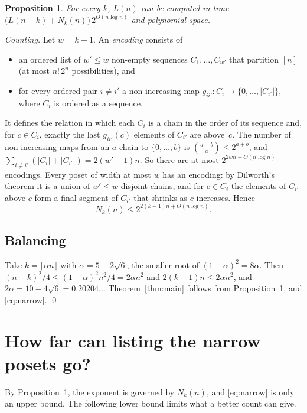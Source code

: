 \documentclass[11pt]{article}
\newtheorem{proposition}[theorem]{Proposition}
\theoremstyle{definition}
\theoremstyle{remark}
\begin{document}
\begin{proposition}\label{prop:time}
For every $k$, $L(n)$ can be computed in time
$\bigl(L(n-k)+N_k(n)\bigr)\,2^{O(n\log n)}$ and polynomial space.
\end{proposition}

\emph{Counting.} Let $w=k-1$. An \emph{encoding} consists of
\begin{itemize}
\item an ordered list of $w'\le w$ non-empty sequences $C_1,\dots,C_{w'}$ that partition
  $[n]$ (at most $n!\,2^n$ possibilities), and
\item for every ordered pair $i\ne i'$ a non-increasing map
  $g_{ii'}\colon C_i\to\{0,\dots,|C_{i'}|\}$, where $C_i$ is ordered as a sequence.
\end{itemize}
It defines the relation in which each $C_i$ is a chain in the order of its sequence and,
for $c\in C_i$, exactly the last $g_{ii'}(c)$ elements of $C_{i'}$ are above~$c$.
The number of non-increasing maps from an $a$-chain to $\{0,\dots,b\}$ is
$\binom{a+b}{a}\le2^{a+b}$, and $\sum_{i\ne i'}(|C_i|+|C_{i'}|)=2(w'-1)n$. So there are at
most $2^{2wn+O(n\log n)}$ encodings.
Every poset of width at most $w$ has an encoding: by Dilworth's theorem it is a union of
$w'\le w$ disjoint chains, and for $c\in C_i$ the elements of $C_{i'}$ above $c$ form a
final segment of $C_{i'}$ that shrinks as $c$ increases. Hence
\begin{equation}\label{eq:narrow}
  N_k(n)\le 2^{2(k-1)n+O(n\log n)} .
\end{equation}

\subsection*{Balancing}
Take $k=\lceil\alpha n\rceil$ with $\alpha=5-2\sqrt6$, the smaller root of
$(1-\alpha)^2=8\alpha$. Then $(n-k)^2/4\le(1-\alpha)^2n^2/4=2\alpha n^2$ and
$2(k-1)n\le2\alpha n^2$, and $2\alpha=10-4\sqrt6=0.20204\ldots$ Theorem~\ref{thm:main}
follows from Proposition~\ref{prop:time}, \cite{KR75} and \eqref{eq:narrow}. \qed

\section{How far can listing the narrow posets go?}

By Proposition~\ref{prop:time}, the exponent is governed by $N_k(n)$, and \eqref{eq:narrow}
is only an upper bound. The following lower bound limits what a better count can give.
\end{document}
